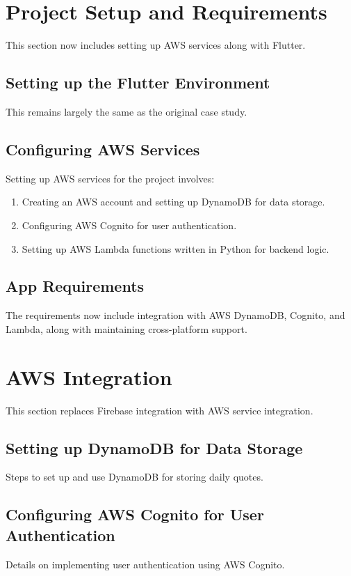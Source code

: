 \documentclass{book}
\begin{document}
\section{Project Setup and Requirements}
This section now includes setting up AWS services along with Flutter.

\subsection{Setting up the Flutter Environment}
This remains largely the same as the original case study.

\subsection{Configuring AWS Services}
Setting up AWS services for the project involves:
\begin{enumerate}
    \item Creating an AWS account and setting up DynamoDB for data storage.
    \item Configuring AWS Cognito for user authentication.
    \item Setting up AWS Lambda functions written in Python for backend logic.
\end{enumerate}

\subsection{App Requirements}
The requirements now include integration with AWS DynamoDB, Cognito, and Lambda, along with maintaining cross-platform support.

\section{AWS Integration}
This section replaces Firebase integration with AWS service integration.

\subsection{Setting up DynamoDB for Data Storage}
Steps to set up and use DynamoDB for storing daily quotes.

\subsection{Configuring AWS Cognito for User Authentication}
Details on implementing user authentication using AWS Cognito.
\end{document}
